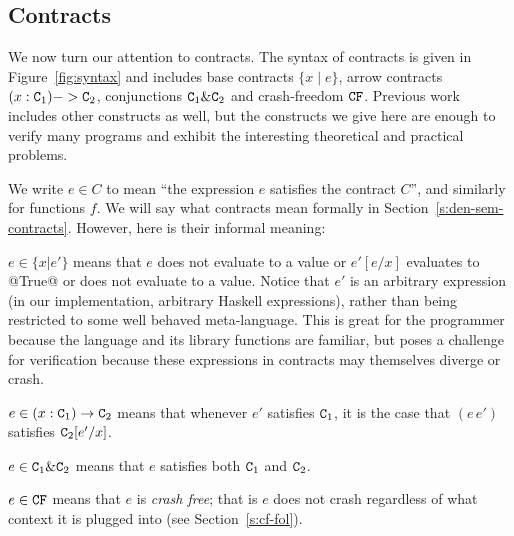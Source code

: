 \subsection{Contracts}


We now turn our attention to contracts. The syntax of contracts
is given in Figure~\ref{fig:syntax} and includes base contracts
$\{ x \mid e \}$, arrow contracts $(x : {\tt C}_1) -> {\tt C}_2$, conjunctions
${\tt C}_1 \& {\tt C}_2$ and crash-freedom ${\tt CF}$. Previous work~\cite{xu+:contracts}
includes other constructs as well, but the constructs we give here are enough to verify
many programs and exhibit the interesting theoretical and practical problems.

We write $e \in C$ to mean ``the expression $e$ satisfies the contract $C$'', and similarly
for functions $f$.  We will say what contracts mean formally in
Section~\ref{s:den-sem-contracts}.  However, here is their informal meaning:
\begin{itemize*}
\item $e \in \{x | e'\}$ means that $e$ does not evaluate to a value
  or $e'[e/x]$ evaluates to @True@ or does not evaluate to a value.
Notice that $e'$ is an arbitrary expression
(in our implementation, arbitrary Haskell expressions),
rather than being restricted to some well behaved meta-language.  This
is great for the programmer because the language and its library
functions are familiar, but poses a challenge for verification
because these expressions in contracts may themselves diverge or
crash.
\item $e \in (x:{\tt C}_1) \rightarrow {\tt C}_2$ means that whenever $e'$ satisfies ${\tt C}_1$, it
is the case that $(e\,e')$ satisfies ${\tt C}_2[e'/x]$.
\item $e \in {\tt C}_1 \& {\tt C}_2$ means that $e$ satisfies both ${\tt C}_1$ and ${\tt C}_2$.
\item $e \in {\tt CF}$ means that $e$ is \emph{crash free}; that is $e$ does not
crash regardless of what context it is plugged into (see Section~\ref{s:cf-fol}).
\end{itemize*}

